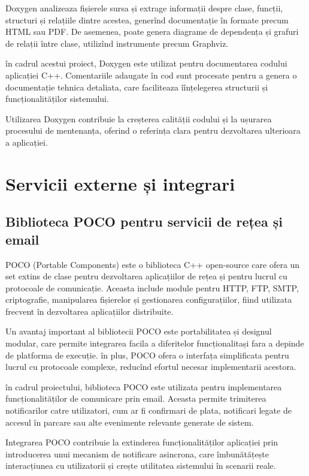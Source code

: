 Doxygen analizeaza fișierele sursa și extrage informații despre clase, funcții, structuri și relațiile dintre acestea, generînd documentație în formate precum HTML sau PDF. De asemenea, poate genera diagrame de dependența și grafuri de relații între clase, utilizînd instrumente precum Graphviz.

în cadrul acestui proiect, Doxygen este utilizat pentru documentarea codului aplicației C++. Comentariile adaugate în cod sunt procesate pentru a genera o documentație tehnica detaliata, care faciliteaza îînțelegerea structurii și funcționalităților sistemului.

Utilizarea Doxygen contribuie la creșterea calității codului și la ușurarea procesului de mentenanța, oferind o referința clara pentru dezvoltarea ulterioara a aplicației.

\section{Servicii externe și integrari}

\subsection*{Biblioteca POCO pentru servicii de rețea și email}

POCO (Portable Components) este o biblioteca C++ open-source care ofera un set extins de clase pentru dezvoltarea aplicațiilor de rețea și pentru lucrul cu protocoale de comunicație. Aceasta include module pentru HTTP, FTP, SMTP, criptografie, manipularea fișierelor și gestionarea configurațiilor, fiind utilizata frecvent în dezvoltarea aplicațiilor distribuite.

Un avantaj important al bibliotecii POCO este portabilitatea și designul modular, care permite integrarea facila a diferitelor funcționalitași fara a depinde de platforma de execuție. în plus, POCO ofera o interfața simplificata pentru lucrul cu protocoale complexe, reducînd efortul necesar implementarii acestora.

în cadrul proiectului, biblioteca POCO este utilizata pentru implementarea funcționalităților de comunicare prin email. Aceasta permite trimiterea notificarilor catre utilizatori, cum ar fi confirmari de plata, notificari legate de accesul în parcare sau alte evenimente relevante generate de sistem.

Integrarea POCO contribuie la extinderea funcționalităților aplicației prin introducerea unui mecanism de notificare asincrona, care îmbunătățește interacțiunea cu utilizatorii și crește utilitatea sistemului în scenarii reale.


